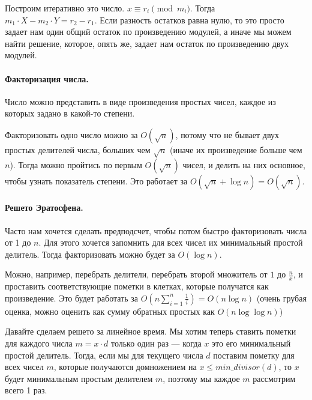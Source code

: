 \documentclass[12pt]{article}
\newcommand{\rangesum}[2]{\displaystyle \sum_{#1}^{#2}}
\begin{document}
Построим итеративно это число. $x \equiv r_i \pmod{m_i}$. Тогда $m_1 \cdot X - m_2 \cdot Y = r_2 - r_1$. Если разность остатков равна нулю, то это просто задает нам один общий остаток по произведению модулей, а иначе мы можем найти решение, которое, опять же, задает нам остаток по произведению двух модулей.

\paragraph{Факторизация числа.} Число можно представить в виде произведения простых чисел, каждое из которых задано в какой-то степени.

Факторизовать одно число можно за $O(\sqrt{n})$, потому что не бывает двух простых делителей числа, больших чем $\sqrt{n}$ (иначе их произведение больше чем $n$). Тогда можно пройтись по первым $O(\sqrt{n})$  чисел, и делить на них основное, чтобы узнать показатель степени. Это работает за $O(\sqrt{n} + \log n) = O(\sqrt{n})$.

\paragraph{Решето Эратосфена.} Часто нам хочется сделать предподсчет, чтобы потом быстро факторизовать числа от 1 до $n$. Для этого хочется запомнить для всех чисел их минимальный простой делитель. Тогда факторизовать можно будет за $O(\log n)$. 

Можно, например, перебрать делители, перебрать второй множитель от $1$ до $\frac{n}{x}$, и проставить соответствующие пометки в клетках, которые получатся как произведение. Это будет работать за $O(n \rangesum{i=1}{n}\frac{1}{i}) = O(n \log n)$ (очень грубая оценка, можно оценить как сумму обратных простых как $O(n\log \log n)$)

Давайте сделаем решето за линейное время. Мы хотим теперь ставить пометки для каждого числа $m = x \cdot d$ только один раз --- когда $x$ это его минимальный простой делитель. Тогда, если мы для текущего числа $d$ поставим пометку для всех чисел $m$, которые получаются домножением на $x \le min\_divisor(d)$, то $x$ будет минимальным простым делителем $m$, поэтому мы каждое $m$ рассмотрим всего 1 раз.
\end{document}
